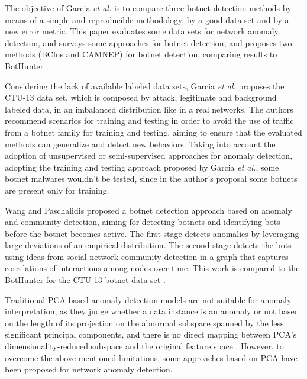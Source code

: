 The objective of Garcia \emph{et al.} \cite{garcia2014empirical} is to compare three botnet detection methods by means of a simple and reproducible methodology, by a good data set and by a new error metric. This paper evaluates some data sets for network anomaly detection, and surveys some approaches for botnet detection, and proposes two methods (BClus and CAMNEP) for botnet detection, comparing results to BotHunter \cite{gu2007bothunter}.

Considering the lack of available labeled data sets, Garcia \emph{et al.} \cite{garcia2014empirical} proposes the CTU-13 data set, which is composed by attack, legitimate and background labeled data, in an imbalanced distribution like in a real networks. The authors recommend scenarios for training and testing in order to avoid the use of traffic from a botnet family for training and testing, aiming to ensure that the evaluated methods can generalize and detect new behaviors. Taking into account the adoption of unsupervised or semi-supervised approaches for anomaly detection, adopting the training and testing approach proposed by Garcia \emph{et al.}, some botnet malwares wouldn't be tested, since in the author's proposal some botnets are present only for training.

Wang and Paschalidis \cite{wang2017botnet} proposed a botnet detection approach based on anomaly and community detection, aiming for detecting botnets and identifying bots before the botnet becomes active. The first stage detects anomalies by leveraging large deviations of an empirical distribution. The second stage detects the bots using ideas from social network community detection in a graph that captures correlations of interactions among nodes over time. This work is compared to the BotHunter \cite{gu2007bothunter} for the CTU-13 botnet data set \cite{garcia2014empirical}.

Traditional PCA-based anomaly detection models are not suitable for anomaly interpretation, as they judge whether a data instance is an anomaly or not based on the length of its projection on the abnormal subspace spanned by the less significant principal components, and there is no direct mapping between PCA’s dimensionality-reduced subspace and the original feature space \cite{ringberg2007sensitivity}. However, to overcome the above mentioned limitations, some approaches based on PCA have been proposed for network anomaly detection. 

